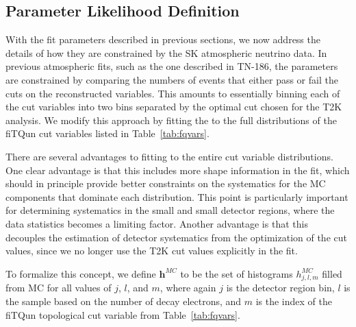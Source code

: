 \subsection{Parameter Likelihood Definition}
\label{subsec:parlike}

With the fit parameters described in previous sections, we now address the
details of how they are constrained by the SK atmospheric neutrino data.  In
previous atmospheric fits, such as the one described in TN-186, the parameters
are constrained by comparing the numbers of events that either pass or fail the
cuts on the reconstructed variables.  This amounts to essentially binning each
of the cut variables into two bins separated by the optimal cut chosen for the
T2K analysis.  We modify this approach by fitting the to the full distributions
of the fiTQun cut variables listed in Table~\ref{tab:fqvars}.

There are several advantages to fitting to the entire cut variable
distributions.  One clear advantage is that this includes more shape
information in the fit, which should in principle provide better constraints on
the systematics for the MC components that dominate each distribution. This
point is particularly important for determining systematics in the small \wall
and small \towall detector regions, where the data statistics becomes a limiting
factor.  Another advantage is that this decouples the estimation of detector
systematics from the optimization of the cut values, since we no longer use the
T2K cut values explicitly in the fit.   

To formalize this concept, we define $\mathbf{h}^{MC}$ to be the set of
histograms $h^{MC}_{j,l,m}$ filled from MC for all values of $j$, $l$, and $m$,
where again $j$  is the detector region bin, $l$ is the sample based on the
number of decay electrons, and $m$ is the index of the fiTQun topological cut
variable from Table~\ref{tab:fqvars}.

